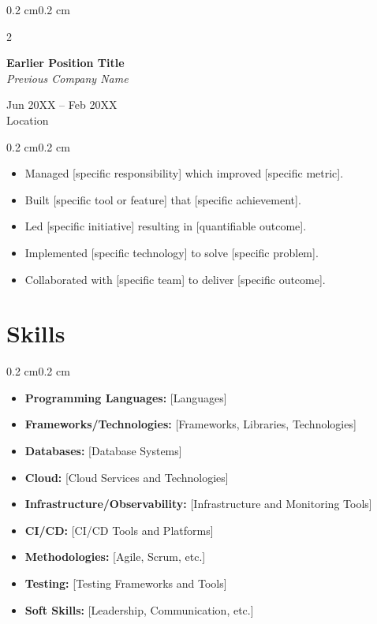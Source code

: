 \documentclass[11pt, letterpaper]{article}
\newenvironment{highlights}{
    \begin{itemize}[
        topsep=0.10 cm,
        parsep=0.10 cm,
        partopsep=0pt,
        itemsep=0pt,
        leftmargin=0.4 cm + 10pt
    ]
}{
    \end{itemize}
} %
\newenvironment{onecolentry}{
    \begin{adjustwidth}{0.2 cm}{0.2 cm}
}{
    \end{adjustwidth}
} %
\newenvironment{twocolentry}[2][]{
    \onecolentry
    \def\secondColumn{#2}
    \setcolumnwidth{\fill, 4.5 cm}
    \begin{paracol}{2}
}{
    \switchcolumn \raggedleft \secondColumn
    \end{paracol}
    \endonecolentry
} %
\begin{document}
    \vspace{0.3 cm}
    \begin{twocolentry}{
        Jun 20XX -- Feb 20XX \\
        Location
    }
        \textbf{Earlier Position Title}\\[0.2cm]
        \textit{Previous Company Name}
    \end{twocolentry}
    \vspace{0.10 cm}
    \begin{onecolentry}
        \begin{highlights}
            \item Managed [specific responsibility] which improved [specific metric].
            \item Built [specific tool or feature] that [specific achievement].
            \item Led [specific initiative] resulting in [quantifiable outcome].
            \item Implemented [specific technology] to solve [specific problem].
            \item Collaborated with [specific team] to deliver [specific outcome].
        \end{highlights}
    \end{onecolentry}
    \section{Skills}
    \begin{onecolentry}
        \begin{highlights}
            \item \textbf{Programming Languages:} [Languages]
            \item \textbf{Frameworks/Technologies:} [Frameworks, Libraries, Technologies]
            \item \textbf{Databases:} [Database Systems]
            \item \textbf{Cloud:} [Cloud Services and Technologies]
            \item \textbf{Infrastructure/Observability:} [Infrastructure and Monitoring Tools]
            \item \textbf{CI/CD:} [CI/CD Tools and Platforms]
            \item \textbf{Methodologies:} [Agile, Scrum, etc.]
            \item \textbf{Testing:} [Testing Frameworks and Tools]
            \item \textbf{Soft Skills:} [Leadership, Communication, etc.]
        \end{highlights}
    \end{onecolentry}
\end{document}
